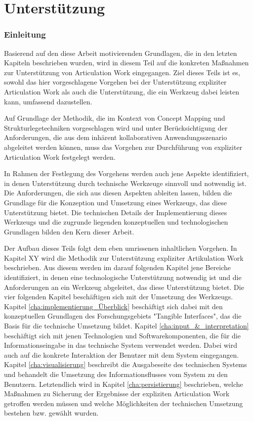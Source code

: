 \part{Unterstützung} %
\label{prt:umsetzung}

\section*{Einleitung} %
\label{sec:umsetzung_einleitung}
\thispagestyle{empty}

Basierend auf den diese Arbeit motivierenden Grundlagen, die in den letzten Kapiteln beschrieben wurden, wird in diesem Teil auf die konkreten Maßnahmen zur Unterstützung von Articulation Work eingegangen. Ziel dieses Teils ist es, sowohl das hier vorgeschlagene Vorgehen bei der Unterstützung expliziter Articulation Work als auch die Unterstützung, die ein Werkzeug dabei leisten kann, umfassend dazustellen.

Auf Grundlage der Methodik, die im Kontext von Concept Mapping und Strukturlegetechniken vorgeschlagen wird und unter Berücksichtigung der Anforderungen, die aus dem inhärent kollaborativen Anwendungsszenario abgeleitet werden können, muss das Vorgehen zur Durchführung von expliziter Articulation Work festgelegt werden. 

In Rahmen der Festlegung des Vorgehens werden auch jene Aspekte identifiziert, in denen Unterstützung durch technische Werkzeuge sinnvoll und notwendig ist. Die Anforderungen, die sich aus diesen Aspekten ableiten lassen, bilden die Grundlage für die Konzeption und Umsetzung eines Werkzeugs, das diese Unterstützung bietet. Die technischen Details der Implementierung dieses Werkzeugs und die zugrunde liegenden konzeptuellen und technologischen Grundlagen bilden den Kern dieser Arbeit.

Der Aufbau dieses Teils folgt dem eben umrissenen inhaltlichen Vorgehen. In Kapitel XY wird die Methodik zur Unterstützung expliziter Artikulation Work beschrieben. Aus diesem werden im darauf folgenden Kapitel jene Bereiche identifiziert, in denen eine technologische Unterstützung notwendig ist und die Anforderungen an ein Werkzeug abgeleitet, das diese Unterstützung bietet. Die vier folgenden Kapitel beschäftigen sich mit der Umsetzung des Werkzeugs. Kapitel \ref{cha:implementierung_Überblick} beschäftigt sich dabei mit den konzeptuellen Grundlagen des Forschungsgebiets "Tangible Interfaces", das die Basis für die technische Umsetzung bildet. Kapitel \ref{cha:input_&_interpretation} beschäftigt sich mit jenen Technologien und Softwarekomponenten, die für die Informationseingabe in das technische System verwendet werden. Dabei wird auch auf die konkrete Interaktion der Benutzer mit dem System eingegangen. Kapitel \ref{cha:visualisierung} beschreibt die Ausgabeseite des technischen Systems und behandelt die Umsetzung des Informationsflusses vom System zu den Benutzern. Letztendlich wird in Kapitel \ref{cha:persistierung} beschrieben, welche Maßnahmen zu Sicherung der Ergebnisse der expliziten Articulation Work getroffen werden müssen und welche Möglichkeiten der technischen Umsetzung bestehen bzw. gewählt wurden.

